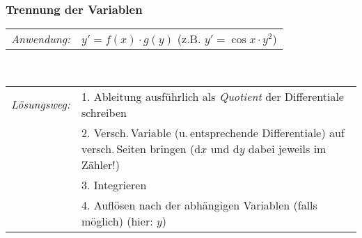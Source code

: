 \documentclass[a4paper,10pt,titlepage]{scrartcl}
\begin{document}
\subsubsection*{Trennung der Variablen}
\begin{tabular}{ll}
 \emph{Anwendung:}
&
 $y'=f(x)\cdot g(y)$ \qquad (z.B. $y'=\cos x\cdot y^2$)
\\
\end{tabular}
\smallskip\\
\begin{tabular}{ll}
 \emph{Lösungsweg:}
& 1. Ableitung ausführlich als \emph{Quotient} der Differentiale schreiben
\\
& 2. Versch.\,Variable (u.\,entsprechende Differentiale) auf versch.\,Seiten bringen ($\mathrm{d}x$ und $\mathrm{d}y$ dabei jeweils im Zähler!)
\\
& 3. Integrieren
\\
& 4. Auflösen nach der abhängigen Variablen (falls möglich) (hier: $y$)
\\
\end{tabular}

\end{document}
